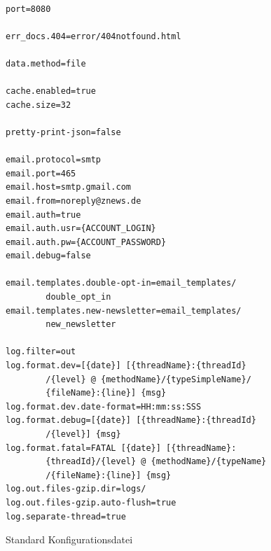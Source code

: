     \begin{figure}[p]
        \centering
        \begin{lstlisting}[frame=single]%formatter:off

port=8080

err_docs.404=error/404notfound.html

data.method=file

cache.enabled=true
cache.size=32

pretty-print-json=false

email.protocol=smtp
email.port=465
email.host=smtp.gmail.com
email.from=noreply@znews.de
email.auth=true
email.auth.usr={ACCOUNT_LOGIN}
email.auth.pw={ACCOUNT_PASSWORD}
email.debug=false

email.templates.double-opt-in=email_templates/
        double_opt_in
email.templates.new-newsletter=email_templates/
        new_newsletter

log.filter=out
log.format.dev=[{date}] [{threadName}:{threadId}
        /{level} @ {methodName}/{typeSimpleName}/
        {fileName}:{line}] {msg}
log.format.dev.date-format=HH:mm:ss:SSS
log.format.debug=[{date}] [{threadName}:{threadId}
        /{level}] {msg}
log.format.fatal=FATAL [{date}] [{threadName}:
        {threadId}/{level} @ {methodName}/{typeName}
        /{fileName}:{line}] {msg}
log.out.files-gzip.dir=logs/
log.out.files-gzip.auto-flush=true
log.separate-thread=true
        \end{lstlisting}%
        \caption{\label{fig:config-std}Standard Konfigurationsdatei}
    \end{figure}




